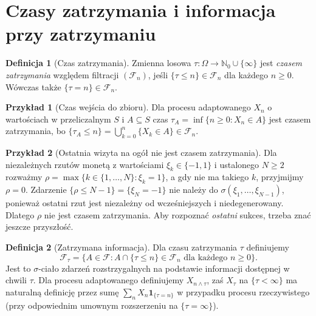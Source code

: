 \documentclass[11pt,a4paper,oneside]{report}
\numberwithin{equation}{chapter}
\theoremstyle{plain}
\theoremstyle{definition}
\newtheorem{definicja}{Definicja}[chapter]
\newtheorem{przyklad}{Przykład}[chapter]
\theoremstyle{remark}
\newcommand{\N}{\mathbb{N}}
\newcommand{\ind}[1]{\mathbf{1}_{#1}}
\begin{document}
\section{Czasy zatrzymania i informacja przy zatrzymaniu}

\begin{definicja}[Czas zatrzymania]
Zmienna losowa $\tau:\Omega\to\N_0\cup\{\infty\}$
jest \emph{czasem zatrzymania} względem filtracji
$(\mathcal F_n)$, jeśli $\{\tau\leq n\}\in\mathcal F_n$
dla każdego $n\geq0$. Wówczas także
$\{\tau=n\}\in\mathcal F_n$.
\end{definicja}

\begin{przyklad}[Czas wejścia do zbioru]
Dla procesu adaptowanego $X_n$ o wartościach w
przeliczalnym $S$ i $A\subseteq S$ czas
$\tau_A=\inf\{n\geq0:X_n\in A\}$ jest czasem
zatrzymania, bo
$\{\tau_A\leq n\}=\bigcup_{k=0}^n\{X_k\in A\}
\in\mathcal F_n$.
\end{przyklad}

\begin{przyklad}[Ostatnia wizyta na ogół nie jest czasem zatrzymania]
Dla niezależnych rzutów monetą z wartościami
$\xi_k\in\{-1,1\}$ i ustalonego $N\geq2$
rozważmy $\rho=\max\{k\in\{1,\ldots,N\}:\xi_k=1\}$,
a gdy nie ma takiego $k$, przyjmijmy $\rho=0$.
Zdarzenie $\{\rho\leq N-1\}=\{\xi_N=-1\}$
nie należy do $\sigma(\xi_1,\ldots,\xi_{N-1})$,
ponieważ ostatni rzut jest niezależny od wcześniejszych
i niedegenerowany. Dlatego $\rho$ nie jest czasem
zatrzymania. Aby rozpoznać \emph{ostatni} sukces,
trzeba znać jeszcze przyszłość.
\end{przyklad}

\begin{definicja}[Zatrzymana informacja]
Dla czasu zatrzymania $\tau$ definiujemy
\[
\mathcal F_\tau=
\{A\in\mathcal F: A\cap\{\tau\leq n\}\in\mathcal F_n
\text{ dla każdego }n\geq0\}.
\]
Jest to $\sigma$-ciało zdarzeń rozstrzygalnych
na podstawie informacji dostępnej w chwili $\tau$.
Dla procesu adaptowanego definiujemy
$X_{n\wedge\tau}$, zaś $X_\tau$ na $\{\tau<\infty\}$
ma naturalną definicję przez sumę
$\sum_n X_n\ind{\{\tau=n\}}$ w przypadku
procesu rzeczywistego (przy odpowiednim umownym
rozszerzeniu na $\{\tau=\infty\}$).
\end{definicja}
\end{document}
